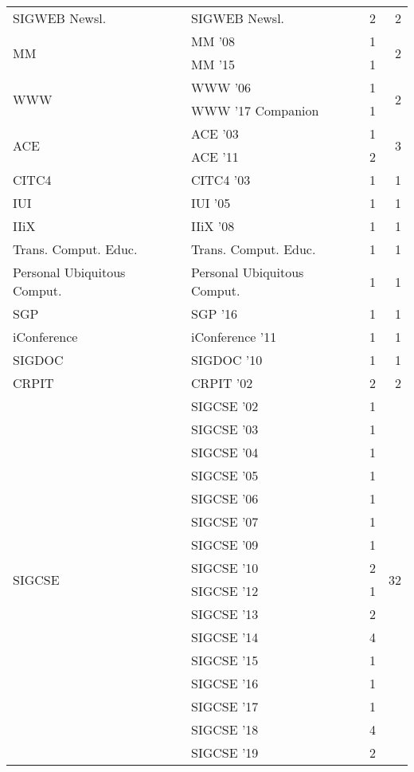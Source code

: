 \begin{table*}[t]
\begin{tabular}{llrr}
\multirow{1}{*}{SIGWEB Newsl.} & SIGWEB Newsl. & 2 & \multirow{1}{*}{2}\\
\multirow{2}{*}{MM } & MM '08 & 1 & \multirow{2}{*}{2}\\
& MM '15 & 1 &\\
\multirow{2}{*}{WWW } & WWW '06 & 1 & \multirow{2}{*}{2}\\
& WWW '17 Companion & 1 &\\
\multirow{2}{*}{ACE } & ACE '03 & 1 & \multirow{2}{*}{3}\\
& ACE '11 & 2 &\\
\multirow{1}{*}{CITC4 } & CITC4 '03 & 1 & \multirow{1}{*}{1}\\
\multirow{1}{*}{IUI } & IUI '05 & 1 & \multirow{1}{*}{1}\\
\multirow{1}{*}{IIiX } & IIiX '08 & 1 & \multirow{1}{*}{1}\\
\multirow{1}{*}{Trans. Comput. Educ.} & Trans. Comput. Educ. & 1 & \multirow{1}{*}{1}\\
\multirow{1}{*}{Personal Ubiquitous Comput.} & Personal Ubiquitous Comput. & 1 & \multirow{1}{*}{1}\\
\multirow{1}{*}{SGP } & SGP '16 & 1 & \multirow{1}{*}{1}\\
\multirow{1}{*}{iConference } & iConference '11 & 1 & \multirow{1}{*}{1}\\
\multirow{1}{*}{SIGDOC } & SIGDOC '10 & 1 & \multirow{1}{*}{1}\\
\multirow{1}{*}{CRPIT } & CRPIT '02 & 2 & \multirow{1}{*}{2}\\
\multirow{20}{*}{SIGCSE } & SIGCSE '02 & 1 & \multirow{20}{*}{32}\\
& SIGCSE '03 & 1 &\\
& SIGCSE '04 & 1 &\\
& SIGCSE '05 & 1 &\\
& SIGCSE '06 & 1 &\\
& SIGCSE '07 & 1 &\\
& SIGCSE '09 & 1 &\\
& SIGCSE '10 & 2 &\\
& SIGCSE '12 & 1 &\\
& SIGCSE '13 & 2 &\\
& SIGCSE '14 & 4 &\\
& SIGCSE '15 & 1 &\\
& SIGCSE '16 & 1 &\\
& SIGCSE '17 & 1 &\\
& SIGCSE '18 & 4 &\\
& SIGCSE '19 & 2 &\\

\end{tabular}
\end{table*}
